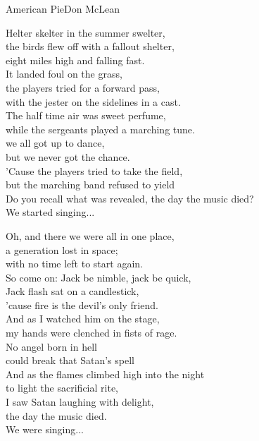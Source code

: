 \begin{song}{American Pie}{Don McLean}

\begin{guitar}
Helter skelter in the summer swelter, \\
the birds flew off with a fallout shelter,\\
eight miles high and falling fast. \\
It landed foul on the grass,\\
the players tried for a forward pass,\\
with the jester on the sidelines in a cast.\\
The half time air was sweet perfume, \\
while the sergeants played a marching tune.\\
we all got up to dance, \\ 
but we never got the chance. \\
'Cause the players tried to take the field,\\
but the marching band refused to yield\\
Do you recall what was revealed,
the day the music died?\\
We started singing... \\
\end{guitar}


\begin{guitar}
Oh, and there we were all in one place,\\
a generation lost in space;\\
with no time left to start again.\\
So come on: Jack be nimble, jack be quick,\\
Jack flash sat on a candlestick,\\
'cause fire is the devil's only friend.\\
And as I watched him on the stage,\\
my hands were clenched in fists of rage.\\
No angel born in hell\\
could break that Satan’s spell\\
And as the flames climbed high into the night\\
to light the sacrificial rite,\\
I saw Satan laughing with delight,\\
the day the music died.    \\
We were singing... \\
\end{guitar}


\end{song}
